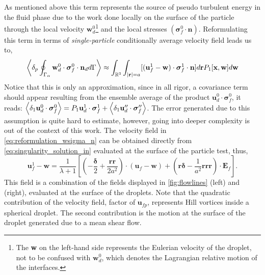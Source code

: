 As mentioned above this term represents the source of pseudo turbulent energy in the fluid phase due to the work done locally on the surface of the particle through the local velocity $\textbf{w}_d^0$\footnote{The \textbf{w} on the left-hand side represents the Eulerian velocity of the droplet, not to be confused with $\textbf{w}_d^0$, which denotes the Lagrangian relative motion of the interfaces.} and the local stresses $(\bm\sigma_f^0 \cdot \textbf{n})$.
Reformulating this term in terms of \textit{single-particle} conditionally average velocity field leads us to, 
\begin{equation}
    \pavg{ \intS{\textbf{w}_d^0 \cdot \bm{\sigma}_f^0 \cdot \textbf{n}_d}}
    \approx
    \int_{\mathbb{R}^3} \int_{|\textbf{r}| = a}
    [(\textbf{u}^1_f - \textbf{w})\cdot \bm\sigma_f^1\cdot \textbf{n} ]
    d\textbf{r}
    P_1[\textbf{x},\textbf{w}]
    d\textbf{w} 
    \label{eq:reformulation_wsigma_n}
\end{equation} 
Notice that this is only an approximation, since in all rigor, a covariance term should appear resulting from the ensemble average of the product $\textbf{u}_d^0 \cdot \bm{\sigma}_f^0$, it reads: $\left<\delta_1 \textbf{u}_d^0 \cdot \bm{\sigma}_f^0\right> = P_1 \textbf{u}_d^1 \cdot  \bm\sigma_f^1 + \left<\delta_1 \textbf{u}_d'' \cdot \bm{\sigma}_f''\right> $. 
The error generated due to this assumption is quite hard to estimate, however, going into deeper complexity is out of the context of this work. 
The velocity field in \ref{eq:reformulation_wsigma_n} can be obtained directly from \ref{eq:singularity_solution_in}  evaluated at the surface of the particle test, thus,
\begin{equation*}
    \textbf{u}^1_f - \textbf{w}
    = 
    \frac{1}{\lambda +1} \left[\left(
        -\frac{\bm\delta}{2}
        + 
        \frac{\textbf{rr}}{2a^2}
    \right)\cdot (\textbf{u}_{f} - \textbf{w}) 
    + \left(\textbf{r}\bm\delta
    -\frac{1}{a^2}\textbf{rrr}\right)\cdot \textbf{E}_f
    \right].
\end{equation*}
This field is a combination of the fields displayed in \ref{fig:flowlines} (left) and (right), evaluated at the surface of the droplets. 
Note that the quadratic contribution of the velocity field, factor of $\textbf{u}_{fp}$, represents Hill vortices inside a spherical droplet. 
The second contribution is the motion at the surface of the droplet generated due to a mean shear flow. 

